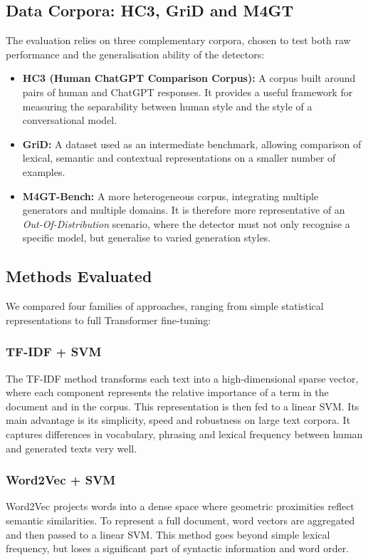 \documentclass[11pt,a4paper]{article}
\begin{document}
\subsection{Data Corpora: HC3, GriD and M4GT}
The evaluation relies on three complementary corpora, chosen to test both raw
performance and the generalisation ability of the detectors:
\begin{itemize}
    \item \textbf{HC3 (Human ChatGPT Comparison Corpus):} A corpus built around
    pairs of human and ChatGPT responses. It provides a useful framework for
    measuring the separability between human style and the style of a
    conversational model.
    \item \textbf{GriD:} A dataset used as an intermediate benchmark, allowing
    comparison of lexical, semantic and contextual representations on a smaller
    number of examples.
    \item \textbf{M4GT-Bench:} A more heterogeneous corpus, integrating multiple
    generators and multiple domains. It is therefore more representative of an
    \textit{Out-Of-Distribution} scenario, where the detector must not only
    recognise a specific model, but generalise to varied generation styles.
\end{itemize}

\subsection{Methods Evaluated}
We compared four families of approaches, ranging from simple statistical
representations to full Transformer fine-tuning:

\subsubsection{TF-IDF + SVM}
The TF-IDF method transforms each text into a high-dimensional sparse vector,
where each component represents the relative importance of a term in the
document and in the corpus. This representation is then fed to a linear SVM.
Its main advantage is its simplicity, speed and robustness on large text
corpora. It captures differences in vocabulary, phrasing and lexical frequency
between human and generated texts very well.

\subsubsection{Word2Vec + SVM}
Word2Vec projects words into a dense space where geometric proximities reflect
semantic similarities. To represent a full document, word vectors are aggregated
and then passed to a linear SVM. This method goes beyond simple lexical
frequency, but loses a significant part of syntactic information and word order.
\end{document}
